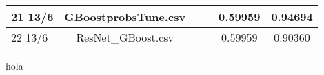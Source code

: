 \begin{landscape}
\begin{table}[H]
\begin{tabular}{|l|c|c|c|c|c|}
21 13/6                                                   & GBoostprobsTune.csv                                          &                           &                              & 0.59959                                                             & 0.94694               \\ \hline
22 13/6                                                   & ResNet\_GBoost.csv                                           &                           &                              & 0.59959                                                             & 0.90360               \\ \hline
\end{tabular}
\end{table}
\end{landscape}

\newpage
hola